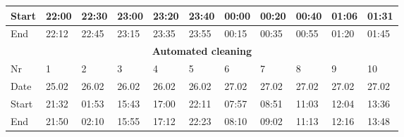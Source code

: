 \begin{table}[H]
\begin{tabular}{|lllllllllll|}
\multicolumn{1}{|l|}{Start}  & \multicolumn{1}{l|}{22:00} & \multicolumn{1}{l|}{22:30} & \multicolumn{1}{l|}{23:00} & \multicolumn{1}{l|}{23:20} & \multicolumn{1}{l|}{23:40} & \multicolumn{1}{l|}{00:00} & \multicolumn{1}{l|}{00:20} & \multicolumn{1}{l|}{00:40} & \multicolumn{1}{l|}{01:06} & 01:31 \\ \hline
\multicolumn{1}{|l|}{End}    & \multicolumn{1}{l|}{22:12} & \multicolumn{1}{l|}{22:45} & \multicolumn{1}{l|}{23:15} & \multicolumn{1}{l|}{23:35} & \multicolumn{1}{l|}{23:55} & \multicolumn{1}{l|}{00:15} & \multicolumn{1}{l|}{00:35} & \multicolumn{1}{l|}{00:55} & \multicolumn{1}{l|}{01:20} & 01:45 \\ \hline
\multicolumn{11}{|c|}{\textbf{Automated cleaning}}                                                                                                                                                                                                                                                        \\ \hline
\multicolumn{1}{|l|}{Nr} & \multicolumn{1}{l|}{1}     & \multicolumn{1}{l|}{2}     & \multicolumn{1}{l|}{3}     & \multicolumn{1}{l|}{4}     & \multicolumn{1}{l|}{5}     & \multicolumn{1}{l|}{6}     & \multicolumn{1}{l|}{7}     & \multicolumn{1}{l|}{8}     & \multicolumn{1}{l|}{9}     & 10    \\ \hline
\multicolumn{1}{|l|}{Date}   & \multicolumn{1}{l|}{25.02} & \multicolumn{1}{l|}{26.02} & \multicolumn{1}{l|}{26.02} & \multicolumn{1}{l|}{26.02} & \multicolumn{1}{l|}{26.02} & \multicolumn{1}{l|}{27.02} & \multicolumn{1}{l|}{27.02} & \multicolumn{1}{l|}{27.02} & \multicolumn{1}{l|}{27.02} & 27.02 \\ \hline
\multicolumn{1}{|l|}{Start}  & \multicolumn{1}{l|}{21:32} & \multicolumn{1}{l|}{01:53} & \multicolumn{1}{l|}{15:43} & \multicolumn{1}{l|}{17:00} & \multicolumn{1}{l|}{22:11} & \multicolumn{1}{l|}{07:57} & \multicolumn{1}{l|}{08:51} & \multicolumn{1}{l|}{11:03} & \multicolumn{1}{l|}{12:04} & 13:36 \\ \hline
\multicolumn{1}{|l|}{End}    & \multicolumn{1}{l|}{21:50} & \multicolumn{1}{l|}{02:10} & \multicolumn{1}{l|}{15:55} & \multicolumn{1}{l|}{17:12} & \multicolumn{1}{l|}{22:23} & \multicolumn{1}{l|}{08:10} & \multicolumn{1}{l|}{09:02} & \multicolumn{1}{l|}{11:13} & \multicolumn{1}{l|}{12:16} & 13:48 \\ \hline
\end{tabular}
\end{table}

